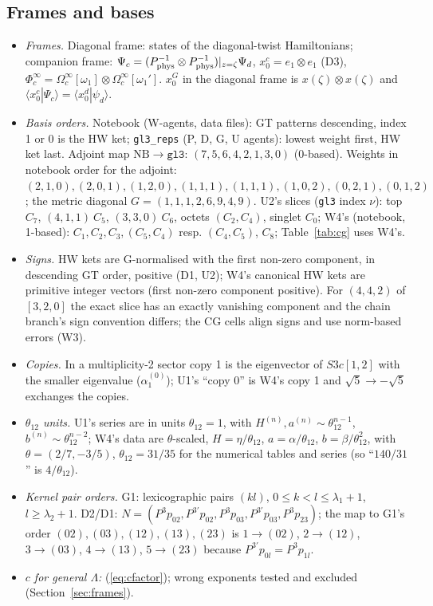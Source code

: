 \documentclass[11pt]{article}
\begin{document}
\subsection{Frames and bases}\label{app:basis}

\begin{itemize}
\item \emph{Frames.} Diagonal frame: states of the diagonal-twist Hamiltonians; companion frame: $\Psi_c=(P_{\rm phys}^{-1}\otimes P_{\rm phys}^{-1})|_{z=\zeta}\Psi_d$, $x_0^c=e_1\otimes e_1$ (D3), $\Phi^\infty_c=\Omega_c^\infty[\omega_1]\otimes\Omega_c^\infty[\omega_1']$. $x_0^G$ in the diagonal frame is $x(\zeta)\otimes x(\zeta)$ and $\langle x_0^c|\Psi_c\rangle=\langle x_0^d|\psi_d\rangle$.
\item \emph{Basis orders.} Notebook (W-agents, data files): GT patterns descending, index 1 or 0 is the HW ket; \texttt{gl3\_\allowbreak{}reps} (P, D, G, U agents): lowest weight first, HW ket last.
Adjoint map $\mathrm{NB}\to\mathtt{gl3}$: $(7,5,6,4,2,1,3,0)$ (0-based).
Weights in notebook order for the adjoint: $(2,1,0),(2,0,1),(1,2,0),(1,1,1),(1,1,1),(1,0,2),(0,2,1),(0,1,2)$; the metric diagonal $G=(1,1,1,2,6,9,4,9)$. U2's slices (\texttt{gl3} index $\nu$): top $C_7$, $(4,1,1)\ C_5$, $(3,3,0)\ C_6$, octets $(C_2,C_4)$, singlet $C_0$; W4's (notebook, 1-based): $C_1,C_2,C_3,(C_5,C_4)$ resp. $(C_4,C_5)$, $C_8$; Table~\ref{tab:cg} uses W4's.
\item \emph{Signs.} HW kets are G-normalised with the first non-zero component, in descending GT order, positive (D1, U2); W4's canonical HW kets are primitive integer vectors (first non-zero component positive).
For $(4,4,2)$ of $[3,2,0]$ the exact slice has an exactly vanishing component and the chain branch's sign convention differs; the CG cells align signs and use norm-based errors (W3).
\item \emph{Copies.} In a multiplicity-2 sector copy 1 is the eigenvector of $S3c[1,2]$ with the smaller eigenvalue ($\alpha_1^{(0)}$); U1's ``copy 0'' is W4's copy 1 and $\sqrt5\to-\sqrt5$ exchanges the copies.
\item \emph{$\theta_{12}$ units.} U1's series are in units $\theta_{12}=1$, with $H^{(n)},a^{(n)}\sim\theta_{12}^{n-1}$, $b^{(n)}\sim\theta_{12}^{n-2}$; W4's data are $\theta$-scaled, $H=\eta/\theta_{12}$, $a=\alpha/\theta_{12}$, $b=\beta/\theta_{12}^2$, with $\theta=(2/7,-3/5)$, $\theta_{12}=31/35$ for the numerical tables and series (so ``$140/31$'' is $4/\theta_{12}$).
\item \emph{Kernel pair orders.} G1: lexicographic pairs $(kl)$, $0\le k<l\le\lambda_1+1$, $l\ge\lambda_2+1$. D2/D1: $N=(P^3p_{02},P^{3\prime}p_{02},P^3p_{03},P^{3\prime}p_{03},P^3p_{23})$; the map to G1's order $(02),(03),(12),(13),(23)$ is $1\to(02)$, $2\to(12)$, $3\to(03)$, $4\to(13)$, $5\to(23)$ because $P^{3\prime}p_{0l}=P^3p_{1l}$.
\item \emph{$c$ for general $\Lambda$:} (\ref{eq:cfactor}); wrong exponents tested and excluded (Section~\ref{sec:frames}).
\end{itemize}
\end{document}
